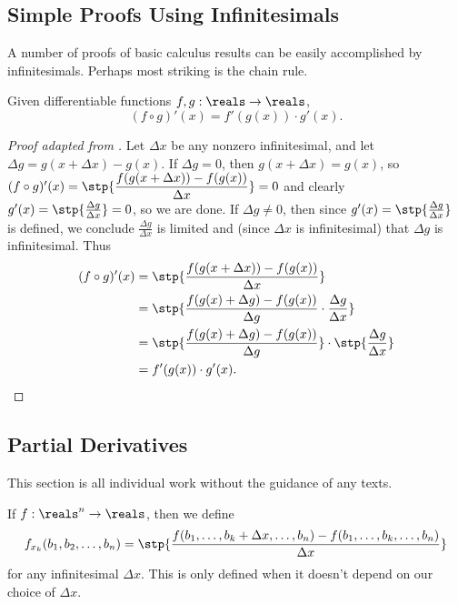 \subsection{Simple Proofs Using Infinitesimals}
A number of proofs of basic calculus results can be easily accomplished by infinitesimals. Perhaps most striking is the chain rule.

\begin{thm}\label{ChainRule}
    Given differentiable functions $f, g: \reals \to \reals$, 
    \[(f \circ g)'(x) = f'(g(x)) \cdot g'(x).\]
\end{thm}

\begin{proof}[Proof adapted from ] 
    Let $\Delta x$ be any nonzero infinitesimal, and let $\Delta g = g(x + \Delta x) - g(x)$. If $\Delta g = 0$, then $g(x + \Delta x) = g(x)$, so $(f \circ g)'(x) = \stp{\dfrac{f(g(x + \Delta x)) - f(g(x))}{\Delta x}} = 0$ and clearly $g'(x) = \stp{\frac{\Delta g}{\Delta x}} = 0$, so we are done. If $\Delta g \neq 0$, then since $g'(x) = \stp{\frac{\Delta g}{\Delta x}}$ is defined, we conclude $\frac{\Delta g}{\Delta x}$ is limited and (since $\Delta x$ is infinitesimal) that $\Delta g$ is infinitesimal. Thus
\begin{align*}
    (f \circ g)'(x) &= \stp{\frac{f(g(x + \Delta x)) - f(g(x))}{\Delta x}} \\
        &= \stp{\frac{f(g(x) + \Delta g) - f(g(x))}{\Delta g} \cdot \frac{\Delta g}{\Delta x}} \\
        &= \stp{\frac{f(g(x) + \Delta g) - f(g(x))}{\Delta g}} \cdot \stp{\frac{\Delta g}{\Delta x}} \\
        &= f'(g(x)) \cdot g'(x).
\end{align*}
\end{proof}

\subsection{Partial Derivatives}
This section is all individual work without the guidance of any texts.

\begin{defn}
    If $f: \reals^n \to \reals$, then we define
    \[f_{x_k}(b_1, b_2, \ldots, b_n) = \stp{\frac{f(b_1, \ldots, b_k + \Delta x, \ldots, b_n) - f(b_1, \ldots, b_k, \ldots, b_n)}{\Delta x}} \]
    for any infinitesimal $\Delta x$. This is only defined when it doesn't depend on our choice of $\Delta x$.
\end{defn}

